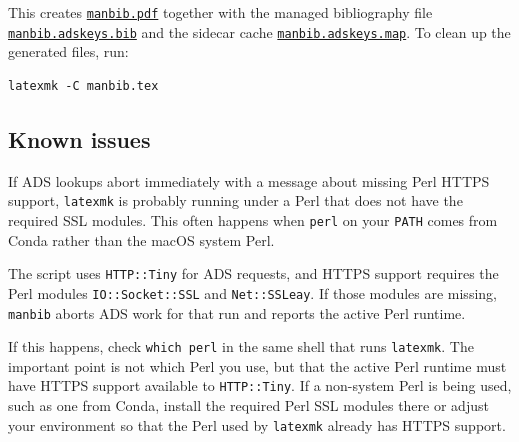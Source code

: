 This creates \href{./manbib.pdf}{\texttt{manbib.pdf}} together with the
managed bibliography file
\href{./manbib.adskeys.bib}{\texttt{manbib.adskeys.bib}} and the sidecar
cache \href{./manbib.adskeys.map}{\texttt{manbib.adskeys.map}}. To clean
up the generated files, run:

\begin{verbatim}
latexmk -C manbib.tex
\end{verbatim}

\subsection{Known issues}\label{known-issues}

If ADS lookups abort immediately with a message about missing Perl HTTPS
support, \texttt{latexmk} is probably running under a Perl that does not
have the required SSL modules. This often happens when \texttt{perl} on
your \texttt{PATH} comes from Conda rather than the macOS system Perl.

The script uses \texttt{HTTP::Tiny} for ADS requests, and HTTPS support
requires the Perl modules \texttt{IO::Socket::SSL} and
\texttt{Net::SSLeay}. If those modules are missing, \texttt{manbib}
aborts ADS work for that run and reports the active Perl runtime.

If this happens, check \texttt{which\ perl} in the same shell that runs
\texttt{latexmk}. The important point is not which Perl you use, but
that the active Perl runtime must have HTTPS support available to
\texttt{HTTP::Tiny}. If a non-system Perl is being used, such as one
from Conda, install the required Perl SSL modules there or adjust your
environment so that the Perl used by \texttt{latexmk} already has HTTPS
support.
